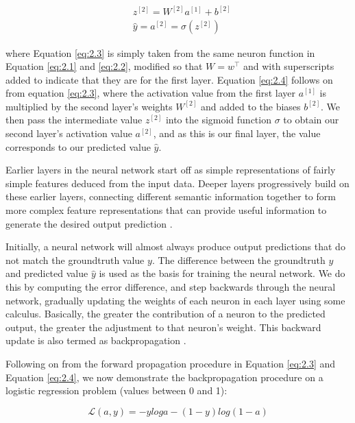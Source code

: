 \begin{equation}\label{eq:2.4}
  \begin{aligned}
    & z^{[2]} = W^{[2]}a^{[1]} + b^{[2]} \\
    & \hat{y} = a^{[2]} = \sigma(z^{[2]})
  \end{aligned}
\end{equation}

where Equation \eqref{eq:2.3} is simply taken from the same neuron function in Equation \eqref{eq:2.1} and \eqref{eq:2.2}, modified so that $W = w^\intercal$ and with superscripts added to indicate that they are for the first layer.
Equation \eqref{eq:2.4} follows on from equation \eqref{eq:2.3}, where the activation value from the first layer $a^{[1]}$ is multiplied by the second layer's weights $W^{[2]}$ and added to the biases $b^{[2]}$.
We then pass the intermediate value $z^{[2]}$ into the sigmoid function $\sigma$ to obtain our second layer's activation value $a^{[2]}$, and as this is our final layer, the value corresponds to our predicted value $\hat{y}$.

Earlier layers in the neural network start off as simple representations of fairly simple features deduced from the input data.
Deeper layers progressively build on these earlier layers, connecting different semantic information together to form more complex feature representations that can provide useful information to generate the desired output prediction \citep{GoodfellowDeeplearning2016}.

Initially, a neural network will almost always produce output predictions that do not match the groundtruth value $y$.
The difference between the groundtruth $y$ and predicted value $\hat{y}$ is used as the basis for training the neural network.
We do this by computing the error difference, and step backwards through the neural network, gradually updating the weights of each neuron in each layer using some calculus.
Basically, the greater the contribution of a neuron to the predicted output, the greater the adjustment to that neuron's weight.
This backward update is also termed as backpropagation \citep{RumelhartLearningrepresentationsbackpropagating1986}.

Following on from the forward propagation procedure in Equation \eqref{eq:2.3} and Equation \eqref{eq:2.4}, we now demonstrate the backpropagation procedure on a logistic regression problem (values between 0 and 1):

\begin{equation}\label{eq:2.5}
  \mathcal{L}(a,y) = -y log a - (1-y)log(1-a)
\end{equation}

